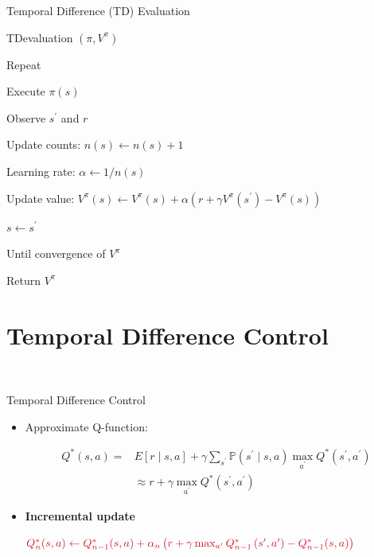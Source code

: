 \documentclass[11pt,table]{beamer}
\begin{document}
\begin{frame}{Temporal Difference (TD) Evaluation}


\begin{tcolorbox}[colframe=black, boxrule=1pt, sharp corners]

\textcolor{red1}{TDevaluation $\left(\pi, V^{\pi}\right)$}


\quad Repeat

\qquad Execute $\pi(s)$

\qquad Observe $s^{\prime}$ and $r$

\qquad Update counts: $n(s) \leftarrow n(s)+1$

\qquad Learning rate: $\alpha \leftarrow 1 / n(s)$

\qquad  Update value: $V^{\pi}(s) \leftarrow V^{\pi}(s)+\alpha\left(r+\gamma V^{\pi}\left(s^{\prime}\right)-V^{\pi}(s)\right)$

\qquad $s \leftarrow s^{\prime}$

\quad Until convergence of $V^{\pi}$

\quad Return $V^{\pi}$


\end{tcolorbox}
    
\end{frame}


\section{Temporal Difference Control}
{
\begin{frame}
\centering
\Huge
\textcolor{white}{Temporal Difference Control}
\thispagestyle{empty}
\end{frame}
}

\begin{frame}{Temporal Difference Control}


\begin{itemize}
    \item Approximate Q-function:

$$
\begin{aligned}
Q^{*}(s, a)= & E[r \mid s, a]+\gamma \sum_{s^{\prime}} \mathbb{P}\left(s^{\prime} \mid s, a\right) \max _{a^{\prime}} Q^{*}\left(s^{\prime}, a^{\prime}\right) \\
& \approx r+\gamma \max _{a^{\prime}} Q^{*}\left(s^{\prime}, a^{\prime}\right)
\end{aligned}
$$

\item \textbf{Incremental update}
\vspace{3mm}
\begin{small}
$\textcolor{red1}{Q_{n}^{*}(s, a) \leftarrow Q_{n-1}^{*}(s, a)+\alpha_{n}\left(r+\gamma \max _{a^{\prime}} Q_{n-1}^{*}\left(s^{\prime}, a^{\prime}\right)-Q_{n-1}^{*}(s, a)\right)}$ 
\end{small}
\end{itemize}
    
\end{frame}
\end{document}
